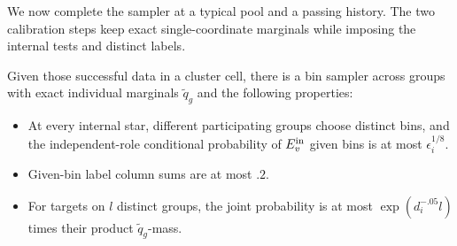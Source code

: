 We now complete the sampler at a typical pool and a passing history.
The two calibration steps keep exact single-coordinate marginals while
imposing the internal tests and distinct labels.

\begin{proposition}\label{prop:calibrated-group-bins}
Given those successful data in a cluster cell, there is a bin sampler
across groups with exact individual marginals \(\widetilde q_g\) and the
following properties:
\begin{itemize}
\item At every internal star, different participating groups choose
distinct bins, and the independent-role conditional probability of
\(E_v^{\rm in}\) given bins is at most \(\epsilon_i^{1/8}\).
\item Given-bin label column sums are at most \(.2\).
\item For targets on \(l\) distinct groups, the joint probability is at
most \(\exp(d_i^{-.05}l)\) times their product \(\widetilde q_g\)-mass.
\end{itemize}
\end{proposition}

